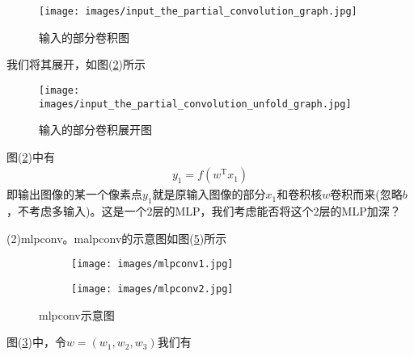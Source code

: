             \begin{figure}[H]
            \centering
            \texttt{[image: images/input\_the\_partial\_convolution\_graph.jpg]}
            \caption{输入的部分卷积图}
            \label{fig:输入的部分卷积图}
            \end{figure}
            我们将其展开，如图(\ref{fig:输入的部分卷积展开图})所示
            \begin{figure}[H]
            \centering
            \texttt{[image: images/input\_the\_partial\_convolution\_unfold\_graph.jpg]}
            \caption{输入的部分卷积展开图}
            \label{fig:输入的部分卷积展开图}
            \end{figure}
            图(\ref{fig:输入的部分卷积展开图})中有
            \begin{align*}
            y_1 = f(w^\mathrm{T}x_1)
            \end{align*}
            即输出图像的某一个像素点$y_1$就是原输入图像的部分$x_1$和卷积核$w$卷积而来(忽略$b$，不考虑多输入)。这是一个2层的MLP，我们考虑能否将这个2层的MLP加深？
            \par
            (2)mlpconv。malpconv的示意图如图(\ref{fig:mlpconv示意图})所示
            \begin{figure}[H]
                \centering
                \begin{subfigure}[b]{0.4\textwidth}
                    \texttt{[image: images/mlpconv1.jpg]}
                    \caption{}
                    \label{fig:mlpconv示意图1}
                \end{subfigure}
                \begin{subfigure}[b]{0.4\textwidth}
                    \texttt{[image: images/mlpconv2.jpg]}
                    \caption{}
                    \label{fig:mlpconv示意图2}
                \end{subfigure}
                \caption{mlpconv示意图}\label{fig:mlpconv示意图}
            \end{figure}
            图(\ref{fig:mlpconv示意图1})中，令$w = (w_1,w_2,w_3)$我们有
